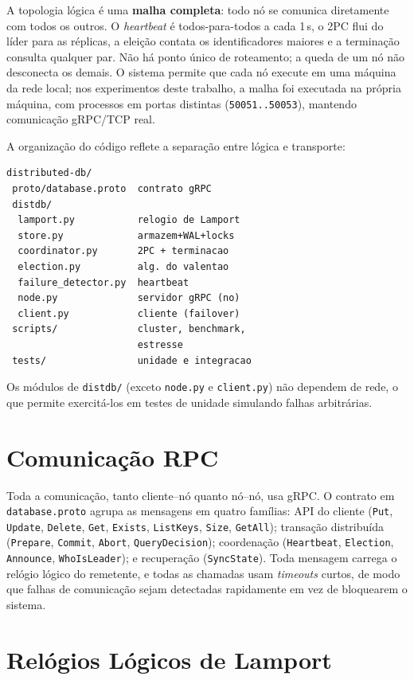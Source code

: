 \documentclass[10pt,twocolumn]{article}
\begin{document}
A topologia lógica é uma \textbf{malha completa}: todo nó se comunica
diretamente com todos os outros. O \emph{heartbeat} é todos-para-todos a
cada 1\,s, o 2PC flui do líder para as réplicas, a eleição contata os
identificadores maiores e a terminação consulta qualquer par. Não há ponto único de roteamento;
a queda de um nó não desconecta os demais. O sistema permite que cada nó
execute em uma máquina da rede local; nos experimentos deste trabalho, a
malha foi executada na própria máquina, com processos em portas distintas
(\texttt{50051..50053}), mantendo comunicação gRPC/TCP real.

A organização do código reflete a separação entre lógica e transporte:

{\footnotesize
\begin{verbatim}
distributed-db/
 proto/database.proto  contrato gRPC
 distdb/
  lamport.py           relogio de Lamport
  store.py             armazem+WAL+locks
  coordinator.py       2PC + terminacao
  election.py          alg. do valentao
  failure_detector.py  heartbeat
  node.py              servidor gRPC (no)
  client.py            cliente (failover)
 scripts/              cluster, benchmark,
                       estresse
 tests/                unidade e integracao
\end{verbatim}}

Os módulos de \texttt{distdb/} (exceto \texttt{node.py} e
\texttt{client.py}) não dependem de rede, o que permite exercitá-los em
testes de unidade simulando falhas arbitrárias.

\section{Comunicação RPC}

Toda a comunicação, tanto cliente--nó quanto nó--nó, usa gRPC. O contrato em
\texttt{database.proto} agrupa as mensagens em quatro famílias: API do
cliente (\texttt{Put}, \texttt{Update}, \texttt{Delete}, \texttt{Get},
\texttt{Exists}, \texttt{ListKeys}, \texttt{Size}, \texttt{GetAll});
transação distribuída (\texttt{Prepare}, \texttt{Commit}, \texttt{Abort},
\texttt{QueryDecision}); coordenação (\texttt{Heartbeat},
\texttt{Election}, \texttt{Announce}, \texttt{WhoIsLeader}); e recuperação
(\texttt{SyncState}). Toda mensagem carrega o relógio lógico do remetente,
e todas as chamadas usam \emph{timeouts} curtos, de modo que falhas de
comunicação sejam detectadas rapidamente em vez de bloquearem o sistema.

\section{Relógios Lógicos de Lamport}
\end{document}
